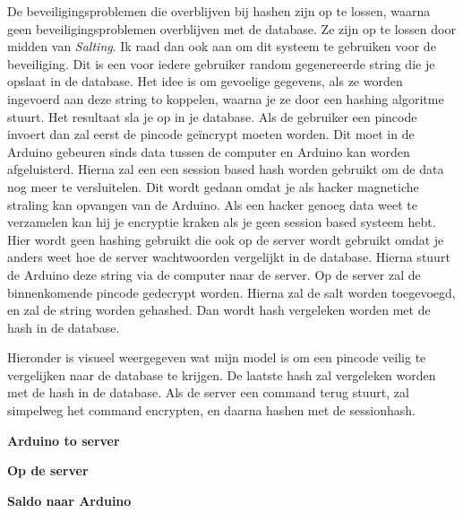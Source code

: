 \documentclass{article}
\begin{document}
De beveiligingsproblemen die overblijven bij hashen zijn op te lossen, waarna geen beveiligingsproblemen overblijven met de database.
Ze zijn op te lossen door midden van \emph{Salting}.
Ik raad dan ook aan om dit systeem te gebruiken voor de beveiliging.
Dit is een voor iedere gebruiker random gegenereerde string die je opslaat in de database.
Het idee is om gevoelige gegevens, als ze worden ingevoerd aan deze string to koppelen, waarna je ze door een hashing algoritme stuurt.
Het resultaat sla je op in je database.
Als de gebruiker een pincode invoert dan zal eerst de pincode ge\"incrypt moeten worden.
Dit moet in de Arduino gebeuren sinds data tussen de computer en Arduino kan worden afgeluisterd.
Hierna zal een een session based hash worden gebruikt om de data nog meer te versluitelen.
Dit wordt gedaan omdat je als hacker magnetiche straling kan opvangen van de Arduino.
Als een hacker genoeg data weet te verzamelen kan hij je encryptie kraken als je geen session based systeem hebt.
Hier wordt geen hashing gebruikt die ook op de server wordt gebruikt omdat je anders weet hoe de server wachtwoorden vergelijkt in de database.
Hierna stuurt de Arduino deze string via de computer naar de server.
Op de server zal de binnenkomende pincode gedecrypt worden.
Hierna zal de salt worden toegevoegd, en zal de string worden gehashed.
Dan wordt hash vergeleken worden met de hash in de database.

Hieronder is visueel weergegeven wat mijn model is om een pincode veilig te vergelijken naar de database te krijgen. De laatste hash zal vergeleken worden met de hash in de database.
Als de server een command terug stuurt, zal simpelweg het command encrypten, en daarna hashen met de sessionhash.

\hfill

\centerline{\textbf{Arduino to server} }

\vspace{1cm}

\centerline{\textbf{Op de server} }

\vspace{1cm}

\centerline{\textbf{Saldo naar Arduino} }
\end{document}

